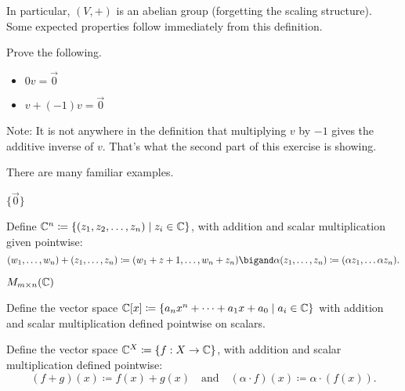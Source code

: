 In particular, $(V,+)$ is an abelian group (forgetting the scaling structure).
Some expected properties follow immediately from this definition.

\begin{exercise}
    Prove the following.
    \begin{itemize}
        \item $0 v=\vec{0}$
        \item $v + (-1)v = \vec{0}$
    \end{itemize}
    Note: It is not anywhere in the definition that multiplying $v$ by $-1$ gives the additive inverse of $v$.
    That's what the second part of this exercise is showing.
\end{exercise}

There are many familiar examples.

\begin{example}[Zero]
    $\{ \vec{0} \}$
\end{example}


\begin{example}[$\C$]
    
\end{example}


\begin{example}[Tuples]
    Define $\mathbb{C}^n \coloneq \{ (z_1,z_2,\dots,z_n) \mid z_i \in \mathbb{C} \}$, with addition and scalar multiplication 
    given pointwise:
    \[
        (w_1,\dots,w_n)+(z_1,\dots,z_n) \coloneq (w_1+z+1,\dots,w_n+z_n) \bigand 
        \alpha(z_1,\dots,z_n) \coloneq (\alpha z_1,\dots \alpha z_n).
    \]
\end{example}


\begin{example}[Matrices]
    $M_{m\times n}(\mathbb{C})$
\end{example}


\begin{example}[Polynomials]
    Define the vector space $\mathbb{C}[x] \coloneq \{ a_n x^n +\cdots+ a_1 x + a_0 \mid a_i \in \mathbb{C} \}$ with addition 
    and scalar multiplication defined pointwise on scalars.
\end{example}


\begin{example}[Functions]
    Define the vector space $\mathbb{C}^{X} \coloneq \{ f:X \to \mathbb{C}\}$, with addition and scalar multiplication defined pointwise:
    \[
        (f+g)(x) \coloneq f(x) + g(x) \quad \text{and} \quad (\alpha \cdot f)(x) \coloneq \alpha \cdot (f(x)).
    \]
\end{example}




